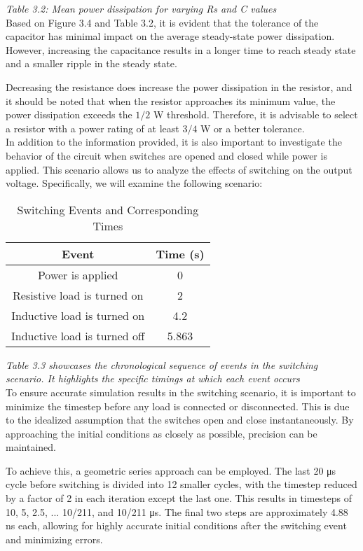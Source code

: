 \emph{Table 3.2: Mean power dissipation for varying Rs and C values}\\

Based on Figure 3.4 and Table 3.2, it is evident that the tolerance of the capacitor has minimal impact on the average steady-state power dissipation. However, increasing the capacitance results in a longer time to reach steady state and a smaller ripple in the steady state.

Decreasing the resistance does increase the power dissipation in the resistor, and it should be noted that when the resistor approaches its minimum value, the power dissipation exceeds the $1/2$ W threshold. Therefore, it is advisable to select a resistor with a power rating of at least $3/4$ W or a better tolerance.\\

In addition to the information provided, it is also important to investigate the behavior of the circuit when switches are opened and closed while power is applied. This scenario allows us to analyze the effects of switching on the output voltage. Specifically, we will examine the following scenario:\\

\begin{table}[h]
\centering
\caption{Switching Events and Corresponding Times}
\begin{tabular}{|c|c|}
\hline
\textbf{Event} & \textbf{Time (s)} \\
\hline
Power is applied & 0 \\
\hline
Resistive load is turned on & 2 \\
\hline
Inductive load is turned on & 4.2 \\
\hline
Inductive load is turned off & 5.863 \\
\hline
\end{tabular}
\end{table}
\emph{Table 3.3 showcases the chronological sequence of events in the switching scenario. It highlights the specific timings at which each event occurs}\\

To ensure accurate simulation results in the switching scenario, it is important to minimize the timestep before any load is connected or disconnected. This is due to the idealized assumption that the switches open and close instantaneously. By approaching the initial conditions as closely as possible, precision can be maintained.

To achieve this, a geometric series approach can be employed. The last 20 μs cycle before switching is divided into 12 smaller cycles, with the timestep reduced by a factor of 2 in each iteration except the last one. This results in timesteps of 10, 5, 2.5, ... 10/211, and 10/211 μs. The final two steps are approximately 4.88 ns each, allowing for highly accurate initial conditions after the switching event and minimizing errors.

